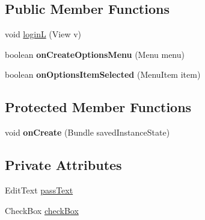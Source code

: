 \subsection*{Public Member Functions}
\begin{DoxyCompactItemize}
\item 
void \hyperlink{classcom_1_1example_1_1sebastian_1_1tindertp_1_1LoginActivity_a96627280f892b2702e01699f75899a06}{loginL} (View v)
\item 
boolean {\bfseries on\+Create\+Options\+Menu} (Menu menu)\hypertarget{classcom_1_1example_1_1sebastian_1_1tindertp_1_1LoginActivity_ad0ba0f0bed60797acd7b45e2a3aab9d1}{}\label{classcom_1_1example_1_1sebastian_1_1tindertp_1_1LoginActivity_ad0ba0f0bed60797acd7b45e2a3aab9d1}

\item 
boolean {\bfseries on\+Options\+Item\+Selected} (Menu\+Item item)\hypertarget{classcom_1_1example_1_1sebastian_1_1tindertp_1_1LoginActivity_a34e9db18d0f3d06b5a0a33b0e89e2651}{}\label{classcom_1_1example_1_1sebastian_1_1tindertp_1_1LoginActivity_a34e9db18d0f3d06b5a0a33b0e89e2651}

\end{DoxyCompactItemize}
\subsection*{Protected Member Functions}
\begin{DoxyCompactItemize}
\item 
void {\bfseries on\+Create} (Bundle saved\+Instance\+State)\hypertarget{classcom_1_1example_1_1sebastian_1_1tindertp_1_1LoginActivity_a16c3f224cb166a736cbb7d3f6ec59b2d}{}\label{classcom_1_1example_1_1sebastian_1_1tindertp_1_1LoginActivity_a16c3f224cb166a736cbb7d3f6ec59b2d}

\end{DoxyCompactItemize}
\subsection*{Private Attributes}
\begin{DoxyCompactItemize}
\item 
Edit\+Text \hyperlink{classcom_1_1example_1_1sebastian_1_1tindertp_1_1LoginActivity_a8590bdba6d094c75f8dd360c5a78c928}{pass\+Text}
\item 
Check\+Box \hyperlink{classcom_1_1example_1_1sebastian_1_1tindertp_1_1LoginActivity_a429a1234958cee5c83b36522f16ae100}{check\+Box}
\end{DoxyCompactItemize}
